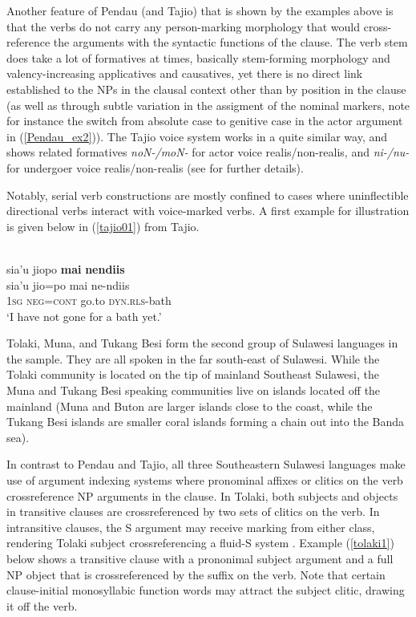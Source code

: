 Another feature of Pendau (and Tajio) that is shown by the examples above is that the verbs do not carry any person-marking morphology that would cross-reference the arguments with the syntactic functions of the clause. The verb stem does take a lot of formatives at times, basically stem-forming morphology and valency-increasing applicatives and causatives, yet there is no direct link established to the NPs in the clausal context other than by position in the clause (as well as through subtle variation in the assigment of the nominal markers, note for instance the switch from absolute case to genitive case in the actor argument in (\ref{Pendau_ex2})). The Tajio voice system works in a quite similar way, and shows related formatives \textit{noN-/moN-} for actor voice realis/non-realis, and \textit{ni-/nu-} for undergoer voice realis/non-realis (see \citealt{mayani2013grammar} for further details). 

Notably, serial verb constructions are mostly confined to cases where uninflectible directional verbs interact with voice-marked verbs. A first example for illustration is given below in (\ref{tajio01}) from Tajio.

\ea \label{tajio01}
\\
\glll sia’u jiopo \textbf{mai} \textbf{nendiis} \\
sia’u jio=po mai ne-ndiis \\
 \textsc{1}\textsc{sg} \textsc{neg}=\textsc{cont} go.to \textsc{dyn}.\textsc{rls}-bath\\
\glft ‘I have not gone for a bath yet.’\\ 
\z

Tolaki, Muna, and Tukang Besi form the second group of Sulawesi languages in the sample. They are all spoken in the far south-east of Sulawesi. While the Tolaki community is located on the tip of mainland Southeast Sulawesi, the Muna and Tukang Besi speaking communities live on islands located off the mainland (Muna and Buton are larger islands close to the coast, while the Tukang Besi islands are smaller coral islands forming a chain out into the Banda sea). 

In contrast to Pendau and Tajio, all three Southeastern Sulawesi languages make use of argument indexing systems where pronominal affixes or clitics on the verb crossreference NP arguments in the clause. In Tolaki, both subjects and objects in transitive clauses are crossreferenced by two sets of clitics on the verb. In intransitive clauses, the S argument may receive marking from either class, rendering Tolaki subject crossreferencing a fluid-S system \citep[115]{mead2008verb}. Example (\ref{tolaki1}) below shows a transitive clause with a prononimal subject argument and a full NP object that is crossreferenced by the suffix on the verb. Note that certain clause-initial monosyllabic function words may attract the subject clitic, drawing it off the verb.

